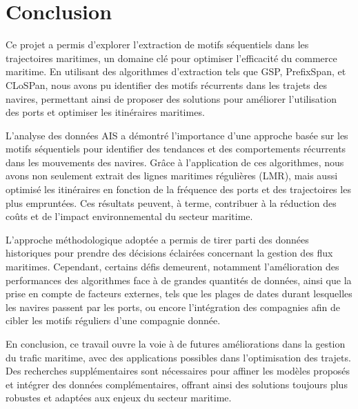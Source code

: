 \documentclass[a4paper,12pt]{article}
\begin{document}
\section{Conclusion}

\vspace{0.4cm}

Ce projet a permis d'explorer l'extraction de motifs séquentiels dans les trajectoires maritimes, un domaine clé pour optimiser l'efficacité du commerce maritime. En utilisant des algorithmes d'extraction tels que GSP, PrefixSpan, et CLoSPan, nous avons pu identifier des motifs récurrents dans les trajets des navires, permettant ainsi de proposer des solutions pour améliorer l'utilisation des ports et optimiser les itinéraires maritimes.

\vspace{0.4cm}

L'analyse des données AIS a démontré l'importance d'une approche basée sur les motifs séquentiels pour identifier des tendances et des comportements récurrents dans les mouvements des navires. Grâce à l'application de ces algorithmes, nous avons non seulement extrait des lignes maritimes régulières (LMR), mais aussi optimisé les itinéraires en fonction de la fréquence des ports et des trajectoires les plus empruntées. Ces résultats peuvent, à terme, contribuer à la réduction des coûts et de l'impact environnemental du secteur maritime.

\vspace{0.4cm}

L'approche méthodologique adoptée a permis de tirer parti des données historiques pour prendre des décisions éclairées concernant la gestion des flux maritimes. Cependant, certains défis demeurent, notamment l'amélioration des performances des algorithmes face à de grandes quantités de données, ainsi que la prise en compte de facteurs externes, tels que les plages de dates durant lesquelles les navires passent par les ports, ou encore l'intégration des compagnies afin de cibler les motifs réguliers d'une compagnie donnée.

\vspace{0.4cm}

En conclusion, ce travail ouvre la voie à de futures améliorations dans la gestion du trafic maritime, avec des applications possibles dans l'optimisation des trajets. Des recherches supplémentaires sont nécessaires pour affiner les modèles proposés et intégrer des données complémentaires, offrant ainsi des solutions toujours plus robustes et adaptées aux enjeux du secteur maritime.
\end{document}

